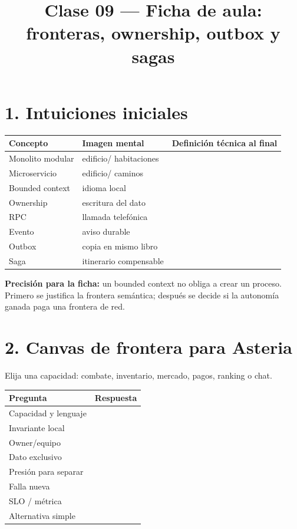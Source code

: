 \documentclass[variant=guia,cover=institutional,mode=print]{ua-engineering-v6-article}
\title{Clase 09 --- Ficha de aula: fronteras, ownership, outbox y sagas}
\author{\UAProfessor}
\date{\UADate}
\begin{document}
\maketitle
\section{1. Intuiciones iniciales}
\begin{tabular}{p{}p{}p{}}
\toprule
Concepto & Imagen mental & Definición técnica al final \\
\midrule
Monolito modular & edificio/ habitaciones & \rule{0pt}{1cm} \\
Microservicio & edificio/ caminos & \rule{0pt}{1cm} \\
Bounded context & idioma local & \rule{0pt}{1cm} \\
Ownership & escritura del dato & \rule{0pt}{1cm} \\
RPC & llamada telefónica & \rule{0pt}{1cm} \\
Evento & aviso durable & \rule{0pt}{1cm} \\
Outbox & copia en mismo libro & \rule{0pt}{1cm} \\
Saga & itinerario compensable & \rule{0pt}{1cm} \\
\bottomrule
\end{tabular}

\newpage

\begin{uainfo}
\textbf{Precisión para la ficha:} un bounded context no obliga a crear un proceso. Primero se justifica la frontera semántica; después se decide si la autonomía ganada paga una frontera de red.
\end{uainfo}

\section{2. Canvas de frontera para Asteria}
Elija una capacidad: combate, inventario, mercado, pagos, ranking o chat.

\begin{tabular}{p{}p{}}
\toprule
Pregunta & Respuesta \\
\midrule
Capacidad y lenguaje & \rule{0pt}{1cm} \\
Invariante local & \rule{0pt}{1cm} \\
Owner/equipo & \rule{0pt}{1cm} \\
Dato exclusivo & \rule{0pt}{1cm} \\
Presión para separar & \rule{0pt}{1cm} \\
Falla nueva & \rule{0pt}{1cm} \\
SLO / métrica & \rule{0pt}{1cm} \\
Alternativa simple & \rule{0pt}{1cm} \\
\bottomrule
\end{tabular}
\end{document}
